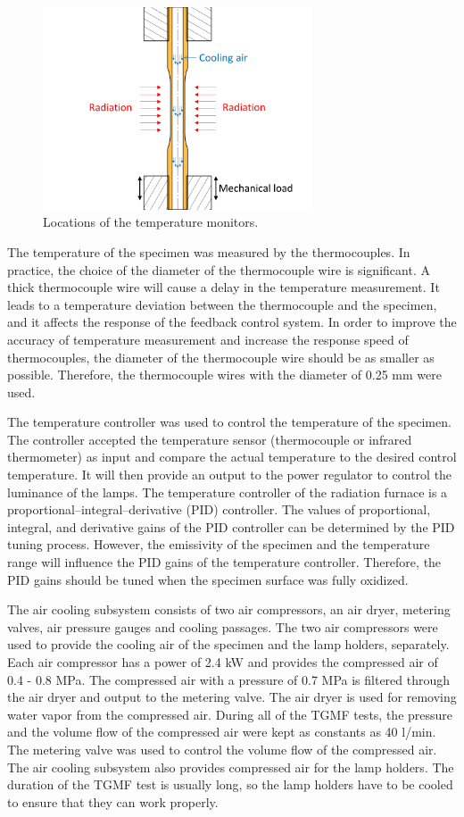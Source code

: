 \documentclass[preprint,5p,twocolumn,11pt,sort&compress]{elsarticle}
\begin{document}
\begin{figure}[!htp]
	\centering
	\includegraphics[width=8.0cm]{cooling.png}
	\caption{Locations of the temperature monitors.}
	\label{Fig:cooling}
\end{figure}

The temperature of the specimen was measured by the thermocouples. In practice, the choice of the diameter of the thermocouple wire is significant. A thick thermocouple wire will cause a delay in the temperature measurement. It leads to a temperature deviation between the thermocouple and the specimen, and it affects the response of the feedback control system. In order to improve the accuracy of temperature measurement and increase the response speed of thermocouples, the diameter of the thermocouple wire should be as smaller as possible. Therefore, the thermocouple wires with the diameter of 0.25 mm were used.

The temperature controller was used to control the temperature of the specimen.
The controller accepted the temperature sensor (thermocouple or infrared thermometer) as input and compare the actual temperature to the desired control temperature. It will then provide an output to the power regulator to control the luminance of the lamps. 
The temperature controller of the radiation furnace is a proportional–integral–derivative (PID) controller. The values of proportional, integral, and derivative gains of the PID controller can be determined by the PID tuning process.
However, the emissivity of the specimen and the temperature range will influence the PID gains of the temperature controller. Therefore, the PID gains should be tuned when the specimen surface was fully oxidized.

The air cooling subsystem consists of two air compressors, an air dryer, metering valves, air pressure gauges and cooling passages. 
The two air compressors were used to provide the cooling air of the specimen and the lamp holders, separately.
Each air compressor has a power of 2.4 kW and provides the compressed air of 0.4 - 0.8 MPa. The compressed air with a pressure of 0.7 MPa is filtered through the air dryer and output to the metering valve. The air dryer is used for removing water vapor from the compressed air.
During all of the TGMF tests, the pressure and the volume flow of the compressed air were kept as constants as 40 l/min. The metering valve was used to control the volume flow of the compressed air.
The air cooling subsystem also provides compressed air for the lamp holders.
The duration of the TGMF test is usually long, so the lamp holders have to be cooled to ensure that they can work properly.
\end{document}
